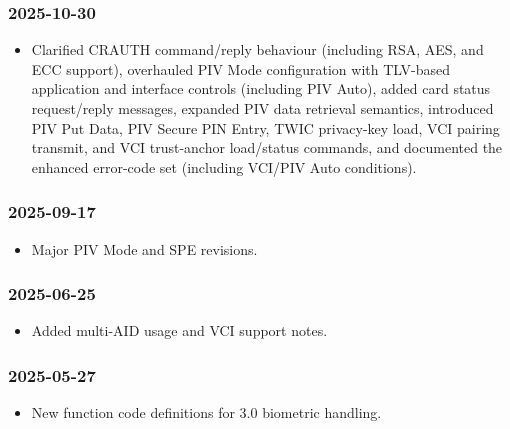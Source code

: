 \subsubsection*{2025-10-30}
\begin{itemize}
  \item Clarified CRAUTH command/reply behaviour (including RSA, AES, and ECC support), overhauled
    PIV Mode configuration with TLV-based application and interface controls (including PIV Auto),
    added card status request/reply messages, expanded PIV data retrieval semantics, introduced PIV
    Put Data, PIV Secure PIN Entry, TWIC privacy-key load, VCI pairing transmit, and VCI
    trust-anchor load/status commands, and documented the enhanced error-code set (including VCI/PIV
    Auto conditions).
\end{itemize}

\subsubsection*{2025-09-17}
\begin{itemize}
  \item Major PIV Mode and SPE revisions.
\end{itemize}

\subsubsection*{2025-06-25}
\begin{itemize}
  \item Added multi-AID usage and VCI support notes.
\end{itemize}

\subsubsection*{2025-05-27}
\begin{itemize}
  \item New function code definitions for 3.0 biometric handling.
\end{itemize}
